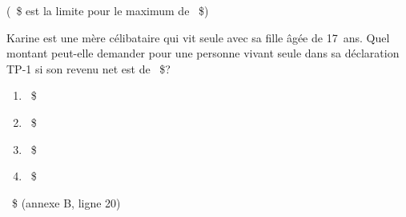 (~\$ est la limite pour le maximum de ~\$)

\begin{question}
	Karine est une mère célibataire qui vit seule avec sa fille âgée de 17~ans. Quel montant peut-elle demander pour une personne vivant seule dans sa déclaration TP-1 si son revenu net est de ~\$?
	\begin{enumerate}[label=\Alph*.]
		\item {}~\$
		\item {}~\$
		\item {}~\$
		\item {}~\$
	\end{enumerate}
\end{question}
~\$ (annexe B, ligne 20)
